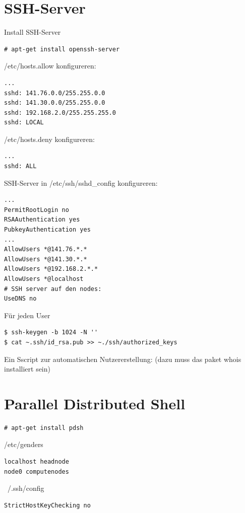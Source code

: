 \section{SSH-Server}
Install SSH-Server
\begin{lstlisting}[style=Bash]
# apt-get install openssh-server 
\end{lstlisting}


/etc/hosts.allow konfigureren:
\begin{lstlisting}[style=Bash]
...
sshd: 141.76.0.0/255.255.0.0
sshd: 141.30.0.0/255.255.0.0
sshd: 192.168.2.0/255.255.255.0
sshd: LOCAL 
\end{lstlisting}
/etc/hosts.deny konfigureren:
\begin{lstlisting}[style=Bash]
...
sshd: ALL
\end{lstlisting}

SSH-Server in /etc/ssh/sshd\_config konfigureren:
\begin{lstlisting}[style=Bash]
...
PermitRootLogin no
RSAAuthentication yes
PubkeyAuthentication yes
...
AllowUsers *@141.76.*.*
AllowUsers *@141.30.*.*
AllowUsers *@192.168.2.*.*
AllowUsers *@localhost
# SSH server auf den nodes:
UseDNS no
\end{lstlisting}

Für jeden User
\begin{lstlisting}[style=Bash]
$ ssh-keygen -b 1024 -N ''
$ cat ~.ssh/id_rsa.pub >> ~./ssh/authorized_keys
\end{lstlisting}

Ein Sscript zur automatischen Nutzererstellung:
(dazu muss das paket whois installiert sein)


\section{Parallel Distributed Shell}
\begin{lstlisting}[style=Bash]
# apt-get install pdsh
\end{lstlisting}
/etc/genders
\begin{lstlisting}[style=Bash]
localhost headnode
node0 computenodes
\end{lstlisting}
~/.ssh/config
\begin{lstlisting}[style=Bash]
StrictHostKeyChecking no
\end{lstlisting}

